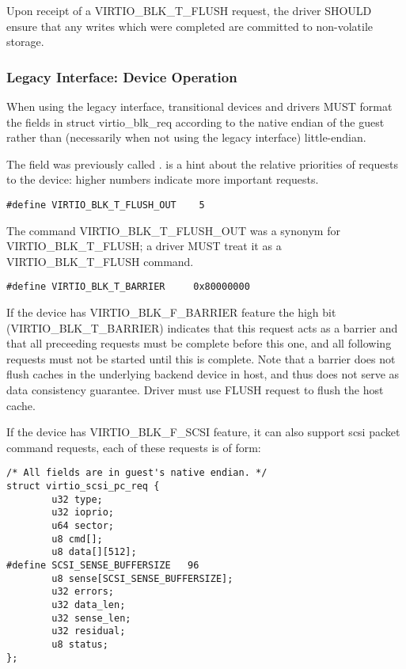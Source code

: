 Upon receipt of a VIRTIO_BLK_T_FLUSH request, the driver SHOULD ensure
that any writes which were completed are committed to non-volatile storage.

\subsubsection{Legacy Interface: Device Operation}\label{sec:Device Types / Block Device / Device Operation / Legacy Interface: Device Operation}
When using the legacy interface, transitional devices and drivers
MUST format the fields in struct virtio_blk_req
according to the native endian of the guest rather than
(necessarily when not using the legacy interface) little-endian.

The  field was previously called .  
is a hint about the relative priorities of requests to the device:
higher numbers indicate more important requests.

\begin{lstlisting}
#define VIRTIO_BLK_T_FLUSH_OUT    5
\end{lstlisting}

The command VIRTIO_BLK_T_FLUSH_OUT was a synonym for VIRTIO_BLK_T_FLUSH;
a driver MUST treat it as a VIRTIO_BLK_T_FLUSH command.

\begin{lstlisting}
#define VIRTIO_BLK_T_BARRIER     0x80000000
\end{lstlisting}

If the device has VIRTIO_BLK_F_BARRIER
feature the high bit (VIRTIO_BLK_T_BARRIER) indicates that this
request acts as a barrier and that all preceeding requests must be
complete before this one, and all following requests must not be
started until this is complete. Note that a barrier does not flush
caches in the underlying backend device in host, and thus does not
serve as data consistency guarantee. Driver must use FLUSH request to
flush the host cache.

If the device has VIRTIO_BLK_F_SCSI feature, it can also support
scsi packet command requests, each of these requests is of form:

\begin{lstlisting}
/* All fields are in guest's native endian. */
struct virtio_scsi_pc_req {
        u32 type;
        u32 ioprio;
        u64 sector;
        u8 cmd[];
        u8 data[][512];
#define SCSI_SENSE_BUFFERSIZE   96
        u8 sense[SCSI_SENSE_BUFFERSIZE];
        u32 errors;
        u32 data_len;
        u32 sense_len;
        u32 residual;
        u8 status;
};
\end{lstlisting}

